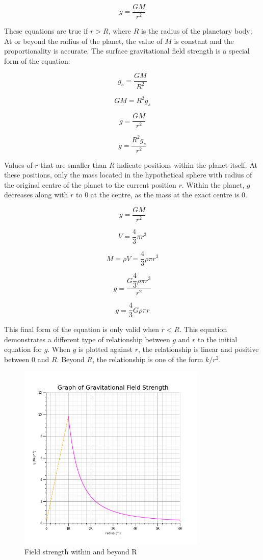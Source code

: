 \documentclass[12pt]{article}
\begin{document}
\[g = \dfrac{GM}{r^2}\]

These equations are true if \(r > R\), where \(R\) is the radius of the planetary body; At or beyond the radius of the planet, the value of \(M\) is constant and the proportionality is accurate. The surface gravitational field strength is a special form of the equation:

\[g_s = \dfrac{GM}{R^2}\]

\[GM = R^2g_s \]

\[g = \dfrac{GM}{r^2}\]

\[g = \dfrac{R^2g_s}{r^2}\]

Values of \(r\) that are smaller than \(R\) indicate positions within the planet itself. At these positions, only the mass located in the hypothetical sphere with radius of the original centre of the planet to the current position \(r\). Within the planet, \(g\) decreases along with \(r\) to 0 at the centre, as the mass at the exact centre is 0.

\[g = \dfrac{GM}{r^2}\]

\[V = \dfrac{4}{3} \pi r^3\]

\[M = \rho V = \dfrac{4}{3} \rho \pi r^3\]

\[g = \dfrac{G \dfrac{4}{3} \rho \pi r^3}{r^2}\]

\[g = \dfrac{4}{3} G \rho \pi r\]

This final form of the equation is only valid when \(r < R\). This equation demonstrates a different type of relationship between \(g\) and \(r\) to the initial equation for \(g\). When \(g\) is plotted against \(r\), the relationship is linear and positive between \(0\) and \(R\). Beyond \(R\), the relationship is one of the form \(k/r^2\).

\begin{figure}[H]
\centering
\includegraphics[width=0.8\textwidth,keepaspectratio]{./images/gravitational_field_strength.png}
\caption{Field strength within and beyond R}
\end{figure}
\end{document}
